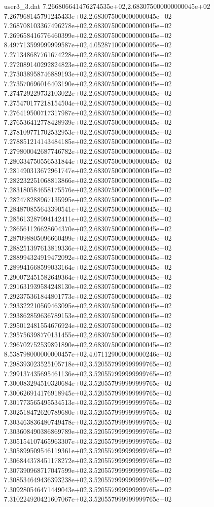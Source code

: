 \begin{filecontents}{user3_3.dat}
7.266806641476274535e+02,2.683075000000000045e+02
7.267968145791245433e+02,2.683075000000000045e+02
7.268708103367496278e+02,2.683075000000000045e+02
7.269658416776460399e+02,2.683075000000000045e+02
8.497713599999999587e+02,4.052871000000000095e+02
7.271348687761674228e+02,2.683075000000000045e+02
7.272089140292824823e+02,2.683075000000000045e+02
7.273038958746889193e+02,2.683075000000000045e+02
7.273570696016403190e+02,2.683075000000000045e+02
7.274729229732103022e+02,2.683075000000000045e+02
7.275470177218154504e+02,2.683075000000000045e+02
7.276419500717317987e+02,2.683075000000000045e+02
7.276536412778428939e+02,2.683075000000000045e+02
7.278109771702532953e+02,2.683075000000000045e+02
7.278851214143484185e+02,2.683075000000000045e+02
7.279800042687746782e+02,2.683075000000000045e+02
7.280334750556531844e+02,2.683075000000000045e+02
7.281490313672961747e+02,2.683075000000000045e+02
7.282232251068813866e+02,2.683075000000000045e+02
7.283180584658175576e+02,2.683075000000000045e+02
7.282478288967135995e+02,2.683075000000000045e+02
7.284870855643390541e+02,2.683075000000000045e+02
7.285613287994142411e+02,2.683075000000000045e+02
7.286561126628604370e+02,2.683075000000000045e+02
7.287098805096660499e+02,2.683075000000000045e+02
7.288251397613819336e+02,2.683075000000000045e+02
7.288994324919472092e+02,2.683075000000000045e+02
7.289941668599033164e+02,2.683075000000000045e+02
7.290072451582649364e+02,2.683075000000000045e+02
7.291631939584248130e+02,2.683075000000000045e+02
7.292375361844801773e+02,2.683075000000000045e+02
7.293322210569463095e+02,2.683075000000000045e+02
7.293862859636789153e+02,2.683075000000000045e+02
7.295012481554676924e+02,2.683075000000000045e+02
7.295756398770131455e+02,2.683075000000000045e+02
7.296702752539891890e+02,2.683075000000000045e+02
8.538798000000000457e+02,4.071129000000000246e+02
7.298393023525105718e+02,3.520557999999999765e+02
7.299137435695461136e+02,3.520557999999999765e+02
7.300083294510320684e+02,3.520557999999999765e+02
7.300626914176918945e+02,3.520557999999999765e+02
7.301773565495534513e+02,3.520557999999999765e+02
7.302518472620789680e+02,3.520557999999999765e+02
7.303463836480749478e+02,3.520557999999999765e+02
7.303608490386869789e+02,3.520557999999999765e+02
7.305154107465963307e+02,3.520557999999999765e+02
7.305899509546119361e+02,3.520557999999999765e+02
7.306844378451178272e+02,3.520557999999999765e+02
7.307390968717047599e+02,3.520557999999999765e+02
7.308534649436393238e+02,3.520557999999999765e+02
7.309280546471449043e+02,3.520557999999999765e+02
7.310224920421607067e+02,3.520557999999999765e+02

\end{filecontents}
